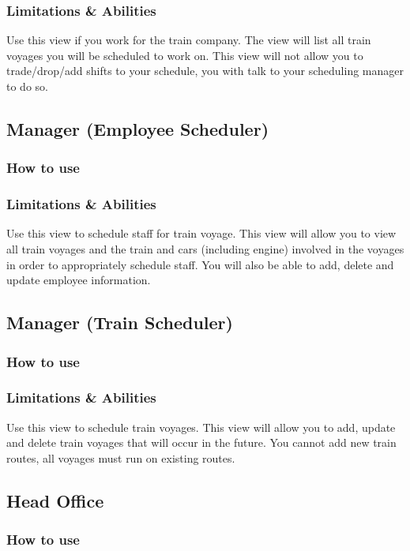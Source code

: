\documentclass[letter]{article}
\begin{document}
\subsubsection{Limitations \& Abilities}
Use this view if you work for the train company. The view will list all train voyages you will be scheduled to work on.  This view will not allow you to trade/drop/add shifts to your schedule, you with talk to your scheduling manager  to do so.


\subsection{Manager (Employee Scheduler)}
\subsubsection{How to use}

\subsubsection{Limitations \& Abilities}
Use this view to schedule staff for train voyage. This view will allow you to view all train voyages and the train and cars (including engine) involved in the voyages in order to appropriately schedule staff. You will also be able to add, delete and update employee information.


\subsection{Manager (Train Scheduler)}
\subsubsection{How to use}

\subsubsection{Limitations \& Abilities}
Use this view to schedule train voyages. This view will allow you to add, update and delete train voyages that will occur in the future. You cannot add new train routes, all voyages must run on existing routes. 


\subsection{Head Office}
\subsubsection{How to use}
\end{document}
